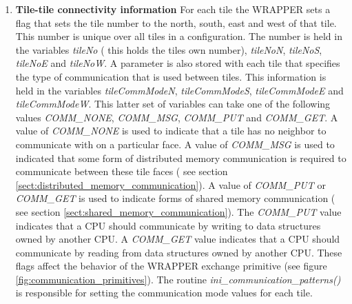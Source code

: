 \begin{enumerate}
\item {\bf Tile-tile connectivity information} For each tile the WRAPPER
sets a flag that sets the tile number to the north, south, east and
west of that tile. This number is unique over all tiles in a 
configuration. The number is held in the variables {\em tileNo}
( this holds the tiles own number), {\em tileNoN}, {\em tileNoS},
{\em tileNoE} and {\em tileNoW}. A parameter is also stored with each tile
that specifies the type of communication that is used between tiles.
This information is held in the variables {\em tileCommModeN},
{\em tileCommModeS}, {\em tileCommModeE} and {\em tileCommModeW}.
This latter set of variables can take one of the following values
{\em COMM\_NONE}, {\em COMM\_MSG}, {\em COMM\_PUT} and {\em COMM\_GET}.
A value of {\em COMM\_NONE} is used to indicate that a tile has no
neighbor to communicate with on a particular face. A value
of {\em COMM\_MSG} is used to indicated that some form of distributed
memory communication is required to communicate between
these tile faces ( see section \ref{sect:distributed_memory_communication}).
A value of {\em COMM\_PUT} or {\em COMM\_GET} is used to indicate 
forms of shared memory communication ( see section 
\ref{sect:shared_memory_communication}). The {\em COMM\_PUT} value indicates 
that a CPU should communicate by writing to data structures owned by another 
CPU. A {\em COMM\_GET} value indicates that a CPU should communicate by reading
from data structures owned by another CPU. These flags affect the behavior
of the WRAPPER exchange primitive 
(see figure \ref{fig:communication_primitives}). The routine 
{\em ini\_communication\_patterns()} is responsible for setting the
communication mode values for each tile.
\\

 \\


\end{enumerate}
